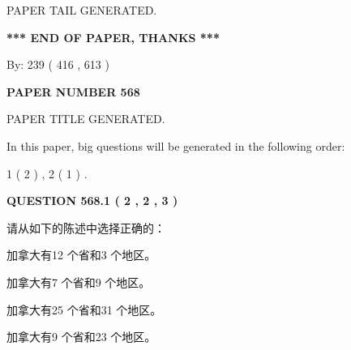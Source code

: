 \documentclass{ctexart}
\begin{document}
   
   
   
   
   
 \vspace{0.2in}
 
   
   
\vspace{2.0in} PAPER TAIL GENERATED.
   
   
   
   
\vspace{1.0in} 
{\textbf{\large{ *** END OF PAPER, THANKS *** }}} 
   
   
\hspace{1.0in} By: 
 239 ( 416 ,  613 )
   
   
   
   
\newpage 
\setcounter{page}{ 
   568001 } 
   
   
   
   
 {\textbf{ \Large{ PAPER NUMBER  568  }}}
   
   
\vspace{0.2in}
   
   
   
   
   
   
   
   
 \vspace{0.2in}
 
 
 
 
   
   
 PAPER TITLE GENERATED.
   
   
   
\vspace{0.2in}
   
In this paper, big questions will be generated in the following order: 
   
   
   1 ( 2 )
 ,
   2 ( 1 )
 .
  
\vspace{0.2in}
  
{\textbf{\Large{QUESTION
568.1 
 ( 2 , 2 , 3 )
}}}
  
  
请从如下的陈述中选择正确的：
 
 
加拿大有12 个省和3 个地区。
 
 
加拿大有7 个省和9 个地区。
 
 
加拿大有25 个省和31 个地区。
 
 
加拿大有9 个省和23 个地区。
 
\end{document}
